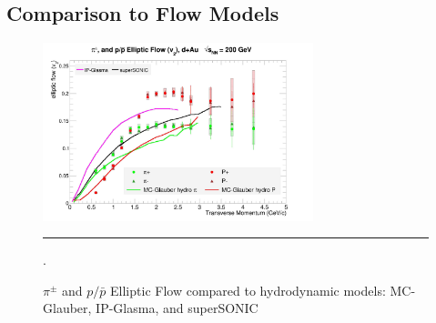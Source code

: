 \subsection{Comparison to Flow Models}
\begin{figure}[hbtp]
\centering    
    \includegraphics[width=0.7\textwidth]{results/v2allpipmodels.jpg}
    \rule{35em}{0.5pt}
    \caption[$\pi^{\pm}$ and $p/\bar{p}$ Elliptic Flow compared to hydrodynamic models.]{$\pi^{\pm}$ and $p/\bar{p}$ Elliptic Flow compared to hydrodynamic models: MC-Glauber\citep{Nagle:2013lja}, IP-Glasma\citep{Schenke:2014gaa}, and superSONIC\citep{Romatschke2015}}.
    \label{fig:hydrov2}
\end{figure}

